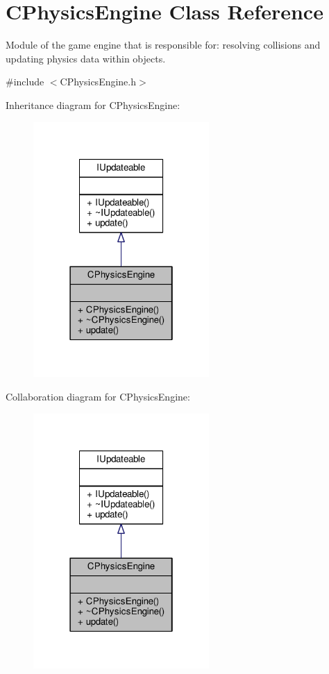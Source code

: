 \hypertarget{classCPhysicsEngine}{\section{C\-Physics\-Engine Class Reference}
\label{classCPhysicsEngine}
}


Module of the game engine that is responsible for\-: resolving collisions and updating physics data within objects.  




{\ttfamily \#include $<$C\-Physics\-Engine.\-h$>$}



Inheritance diagram for C\-Physics\-Engine\-:
\nopagebreak
\begin{figure}[H]
\begin{center}
\leavevmode
\includegraphics[width=190pt]{classCPhysicsEngine__inherit__graph}
\end{center}
\end{figure}


Collaboration diagram for C\-Physics\-Engine\-:
\nopagebreak
\begin{figure}[H]
\begin{center}
\leavevmode
\includegraphics[width=190pt]{classCPhysicsEngine__coll__graph}
\end{center}
\end{figure}
